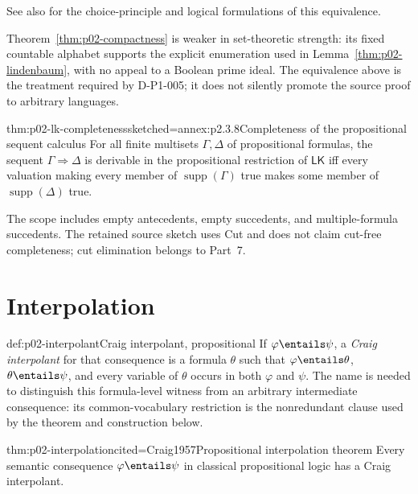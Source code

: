 See also \cite{Jech1973Choice,PaseauLeek2022} for the choice-principle and
logical formulations of this equivalence.

Theorem~\ref{thm:p02-compactness} is weaker in set-theoretic strength: its
fixed countable alphabet supports the explicit enumeration used in
Lemma~\ref{thm:p02-lindenbaum}, with no appeal to a Boolean prime ideal.
The equivalence above is the treatment required by D-P1-005; it does not
silently promote the source proof to arbitrary languages.


\begin{hbtheorem}{thm:p02-lk-completeness}{sketched=annex:p2.3.8}{Completeness of the propositional sequent calculus}
For all finite multisets \(\Gamma,\Delta\) of propositional formulas, the
sequent \(\Gamma\Rightarrow\Delta\) is derivable in the propositional
restriction of \(\mathsf{LK}\) iff every valuation making every member of
\(\operatorname{supp}(\Gamma)\) true makes some member of
\(\operatorname{supp}(\Delta)\) true.
\end{hbtheorem}

The scope includes empty antecedents, empty succedents, and multiple-formula
succedents.  The retained source sketch uses Cut and does not claim cut-free
completeness; cut elimination belongs to Part~7.

\section{Interpolation}
\label{sec:p02-prop-interpolation}

\begin{hbdefinition}{def:p02-interpolant}{Craig interpolant, propositional}
If \(\varphi\entails\psi\), a \emph{Craig interpolant} for that consequence
is a formula \(\theta\) such that
\(\varphi\entails\theta\), \(\theta\entails\psi\), and every variable of
\(\theta\) occurs in both \(\varphi\) and \(\psi\).  The name is needed to
distinguish this formula-level witness from an arbitrary intermediate
consequence: its common-vocabulary restriction is the nonredundant clause used
by the theorem and construction below.
\end{hbdefinition}

\begin{hbtheorem}{thm:p02-interpolation}{cited=Craig1957}{Propositional interpolation theorem}
Every semantic consequence \(\varphi\entails\psi\) in classical
propositional logic has a Craig interpolant.
\end{hbtheorem}

